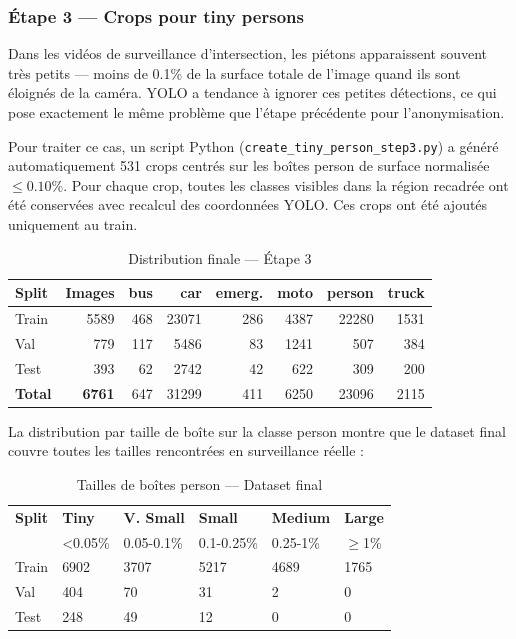 \subsubsection{Étape 3 — Crops pour
               tiny persons}

Dans les vidéos de surveillance
d'intersection, les piétons apparaissent
souvent très petits — moins de 0.1\%
de la surface totale de l'image quand
ils sont éloignés de la caméra. YOLO
a tendance à ignorer ces petites
détections, ce qui pose exactement
le même problème que l'étape précédente
pour l'anonymisation.

Pour traiter ce cas, un script Python
(\texttt{create\_tiny\_person\_step3.py})
a généré automatiquement 531 crops
centrés sur les boîtes person de surface
normalisée $\leq 0.10\%$. Pour chaque
crop, toutes les classes visibles dans
la région recadrée ont été conservées
avec recalcul des coordonnées YOLO.
Ces crops ont été ajoutés uniquement
au train.

\begin{table}[H]
\centering
\caption{Distribution finale — Étape 3}
\small
\begin{tabularx}{\textwidth}{lrrrrrrr}
\toprule
\textbf{Split} &
\textbf{Images} &
\textbf{bus} &
\textbf{car} &
\textbf{emerg.} &
\textbf{moto} &
\textbf{person} &
\textbf{truck} \\
\midrule
Train & 5589 & 468 & 23071 & 286 &
4387 & 22280 & 1531 \\
Val   & 779  & 117 & 5486  & 83  &
1241 & 507   & 384  \\
Test  & 393  & 62  & 2742  & 42  &
622  & 309   & 200  \\
\midrule
\textbf{Total} & \textbf{6761} &
647 & 31299 & 411 &
6250 & 23096 & 2115 \\
\bottomrule
\end{tabularx}
\label{tab:step3_final}
\end{table}

La distribution par taille de boîte
sur la classe person montre que le
dataset final couvre toutes les
tailles rencontrées en surveillance
réelle :

\begin{table}[H]
\centering
\caption{Tailles de boîtes person —
         Dataset final}
\small
\begin{tabularx}{\textwidth}{lXXXXX}
\toprule
\textbf{Split} &
\textbf{Tiny} &
\textbf{V. Small} &
\textbf{Small} &
\textbf{Medium} &
\textbf{Large} \\
& \scriptsize{<0.05\%} &
\scriptsize{0.05-0.1\%} &
\scriptsize{0.1-0.25\%} &
\scriptsize{0.25-1\%} &
\scriptsize{$\geq$1\%} \\
\midrule
Train & 6902 & 3707 & 5217 & 4689 & 1765 \\
Val   & 404  & 70   & 31   & 2    & 0    \\
Test  & 248  & 49   & 12   & 0    & 0    \\
\bottomrule
\end{tabularx}
\label{tab:person_sizes}
\end{table}

